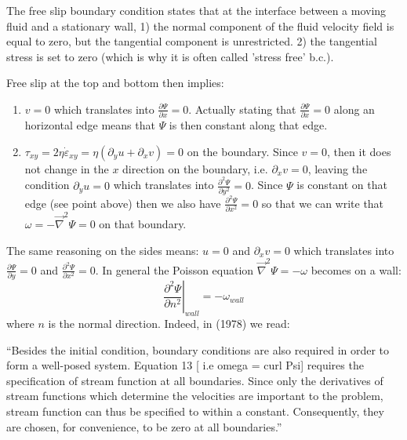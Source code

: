 The free slip boundary condition states that at the interface between a moving fluid and a stationary wall, 
1) the normal component of the fluid velocity field is equal to zero, but the tangential component is unrestricted. 
2) the tangential stress is set to zero (which is why it is often called 'stress free' b.c.).

Free slip at the top and bottom then implies: 
\begin{enumerate}
\item $v=0$ which translates into $\frac{\partial \Psi}{\partial x}=0$.
Actually stating that $\frac{\partial \Psi}{\partial x}=0$ along an horizontal 
edge means that $\Psi$ is then constant along that edge.

\item $\tau_{xy}=2 \eta \dot{\varepsilon}_{xy} =  \eta (\partial_y u + \partial_x v) =0$ on the boundary.
Since $v=0$, then it does not change in the $x$ direction on the boundary, i.e. $\partial_x v=0$, 
leaving the condition $\partial_y u = 0$ which translates into $\frac{\partial^2 \Psi}{\partial y^2}=0$. 
Since $\Psi$ is constant on that edge (see point above) then we also have $\frac{\partial^2 \Psi}{\partial x^2}=0$ so that we can write that $\omega=-\vec\nabla^2 \Psi=0$ on that boundary.
\end{enumerate}

The same reasoning on the sides means: $u=0$ and $\partial_x v = 0$ which 
translates into $\frac{\partial \Psi}{\partial y}=0$ and $\frac{\partial^2 \Psi}{\partial x^2}=0$.
In general the Poisson equation $\vec\nabla^2 \Psi = -\omega$ becomes on a wall: 
\[
\left. \frac{\partial^2 \Psi}{\partial n^2}\right\rvert_{wall}=-\omega_{wall}
\]
where $n$ is the normal direction.
Indeed, in \textcite{hsui78} (1978) we read:
\begin{displayquote}
{\color{darkgray}
``Besides the initial condition,
boundary conditions are also required in order to form a well-posed system. 
Equation 13 [ i.e omega = curl Psi] requires the specification of
stream function at all boundaries. Since only the derivatives of stream functions 
which determine the velocities are important to the problem, stream
function can thus be specified to within a constant. Consequently,
they are chosen, for convenience, to be zero at all boundaries.''
}
\end{displayquote}

